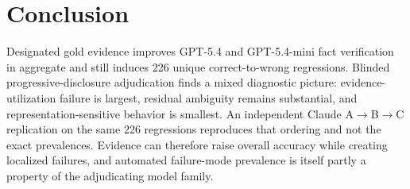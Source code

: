 \section{Conclusion}
\label{sec:conclusion}

Designated gold evidence improves GPT-5.4 and GPT-5.4-mini fact verification in aggregate and still induces 226 unique correct-to-wrong regressions.
Blinded progressive-disclosure adjudication finds a mixed diagnostic picture: evidence-utilization failure is largest, residual ambiguity remains substantial, and representation-sensitive behavior is smallest.
An independent Claude A$\rightarrow$B$\rightarrow$C replication on the same 226 regressions reproduces that ordering and not the exact prevalences.
Evidence can therefore raise overall accuracy while creating localized failures, and automated failure-mode prevalence is itself partly a property of the adjudicating model family.
